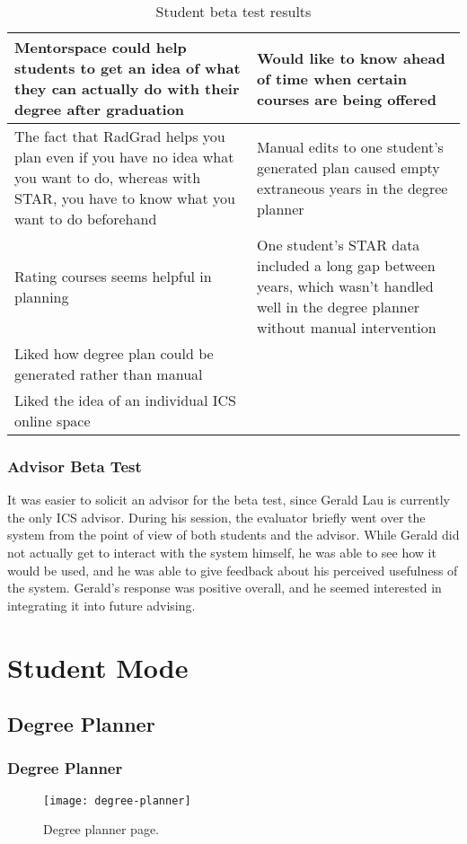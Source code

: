 \begin{table}[htbp!]
\begin{tabular}{ |p{8cm}|p{8cm}|}
 \hline
Mentorspace could help students to get an idea of what they can actually do with their degree after graduation &Would like to know ahead of time when certain courses are being offered\\
 \hline
The fact that RadGrad helps you plan even if you have no idea what you want to do, whereas with STAR, you have to know what you want to do beforehand & Manual edits to one student's generated plan caused empty extraneous years in the degree planner\\
 \hline
Rating courses seems helpful in planning & One student's STAR data included a long gap between years, which wasn't handled well in the degree planner without manual intervention\\
 \hline
Liked how degree plan could be generated rather than manual &\\
 \hline
Liked the idea of an individual ICS online space &\\
 \hline
\end{tabular}
\caption{Student beta test results}
\label{table:3}
\end{table}

\subsubsection{Advisor Beta Test}
It was easier to solicit an advisor for the beta test, since Gerald Lau is currently the only ICS advisor. During his session, the evaluator briefly went over the system from the point of view of both students and the advisor. While Gerald did not actually get to interact with the system himself, he was able to see how it would be used, and he was able to give feedback about his perceived usefulness of the system. Gerald's response was positive overall, and he seemed interested in integrating it into future advising.
\section{Student Mode}
\subsection{Degree Planner}
\subsubsection{Degree Planner}
\begin{figure}[htbp!]
\centering
\texttt{[image: degree-planner]}
\caption{Degree planner page.}
\end{figure}

